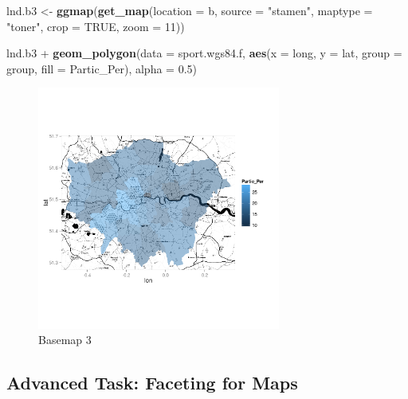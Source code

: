 \documentclass[]{article}
\newenvironment{Shaded}{}{}
\newcommand{\KeywordTok}[1]{\textcolor[rgb]{0.00,0.44,0.13}{\textbf{{#1}}}}
\newcommand{\DataTypeTok}[1]{\textcolor[rgb]{0.56,0.13,0.00}{{#1}}}
\newcommand{\DecValTok}[1]{\textcolor[rgb]{0.25,0.63,0.44}{{#1}}}
\newcommand{\FloatTok}[1]{\textcolor[rgb]{0.25,0.63,0.44}{{#1}}}
\newcommand{\StringTok}[1]{\textcolor[rgb]{0.25,0.44,0.63}{{#1}}}
\newcommand{\OtherTok}[1]{\textcolor[rgb]{0.00,0.44,0.13}{{#1}}}
\newcommand{\NormalTok}[1]{{#1}}
\let\Oldincludegraphics\includegraphics
\renewcommand{\includegraphics}[1]{\Oldincludegraphics[width=8cm]{#1}}
\begin{document}
\begin{Shaded}
\begin{Highlighting}[]
\NormalTok{lnd.b3 <- }\KeywordTok{ggmap}\NormalTok{(}\KeywordTok{get_map}\NormalTok{(}\DataTypeTok{location =} \NormalTok{b, }\DataTypeTok{source =} \StringTok{"stamen"}\NormalTok{, }\DataTypeTok{maptype =} \StringTok{"toner"}\NormalTok{, }
    \DataTypeTok{crop =} \OtherTok{TRUE}\NormalTok{, }\DataTypeTok{zoom =} \DecValTok{11}\NormalTok{))}

\NormalTok{lnd.b3 + }\KeywordTok{geom_polygon}\NormalTok{(}\DataTypeTok{data =} \NormalTok{sport.wgs84.f, }\KeywordTok{aes}\NormalTok{(}\DataTypeTok{x =} \NormalTok{long, }\DataTypeTok{y =} \NormalTok{lat, }\DataTypeTok{group =} \NormalTok{group, }
    \DataTypeTok{fill =} \NormalTok{Partic_Per), }\DataTypeTok{alpha =} \FloatTok{0.5}\NormalTok{)}
\end{Highlighting}
\end{Shaded}
\begin{figure}[htbp]
\centering
\includegraphics{figure/Basemap_3.png}
\caption{Basemap 3}
\end{figure}

\subsection{Advanced Task: Faceting for Maps}
\end{document}

